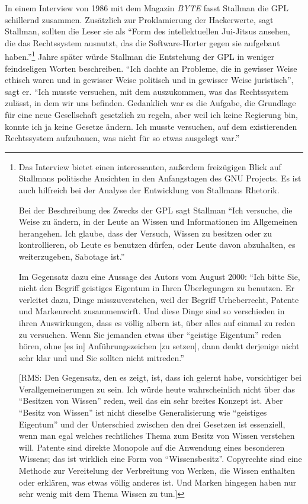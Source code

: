 In einem Interview von 1986 mit dem Magazin \textit{BYTE} fasst Stallman die GPL schillernd zusammen. Zusätzlich zur Proklamierung der Hackerwerte, sagt Stallman, sollten die Leser sie als "`Form des intellektuellen Jui-Jitsus ansehen, die das Rechtssystem ausnutzt, das die Software-Horter gegen sie aufgebaut haben."'\footnote{\cite[Vgl.][]{byte}

Das Interview bietet einen interessanten, außerdem freizügigen Blick auf Stallmans politische Ansichten in den Anfangstagen des GNU Projects. Es ist auch hilfreich bei der Analyse der Entwicklung von Stallmans Rhetorik.

Bei der Beschreibung des Zwecks der GPL sagt Stallman "`Ich versuche, die Weise zu ändern, in der Leute an Wissen und Informationen im Allgemeinen herangehen. Ich glaube, dass der Versuch, Wissen zu besitzen oder zu kontrollieren, ob Leute es benutzen dürfen, oder Leute davon abzuhalten, es weiterzugeben, Sabotage ist."'

Im Gegensatz dazu eine Aussage des Autors vom August 2000: "`Ich bitte Sie, nicht den Begriff \glq geistiges Eigentum\grq{} in Ihren Überlegungen zu benutzen. Er verleitet dazu, Dinge misszuverstehen, weil der Begriff Urheberrecht, Patente und Markenrecht zusammenwirft. Und diese Dinge sind so verschieden in ihren Auswirkungen, dass es völlig albern ist, über alles auf einmal zu reden zu versuchen. Wenn Sie jemanden etwas über "`geistige Eigentum"' reden hören, ohne [es in] Anführungszeichen [zu setzen], dann denkt derjenige nicht sehr klar und und Sie sollten nicht mitreden."'

[RMS: Den Gegensatz, den es zeigt, ist, dass ich gelernt habe, vorsichtiger bei Verallgemeinerungen zu sein. Ich würde heute wahrscheinlich nicht über das "`Besitzen von Wissen"' reden, weil das ein sehr breites Konzept ist. Aber "`Besitz von Wissen"' ist nicht dieselbe Generalisierung wie "`geistiges Eigentum"' und der Unterschied zwischen den drei Gesetzen ist essenziell, wenn man egal welches rechtliches Thema zum Besitz von Wissen verstehen will. Patente sind direkte Monopole auf die Anwendung eines besonderen Wissens; das ist wirklich eine Form von "`Wissensbesitz"'. Copyrechte sind eine Methode zur Vereitelung der Verbreitung von Werken, die Wissen enthalten oder erklären, was etwas völlig anderes ist. Und Marken hingegen haben nur sehr wenig mit dem Thema Wissen zu tun.]} Jahre später würde Stallman die Entstehung der GPL in weniger feindseligen Worten beschreiben. "`Ich dachte an Probleme, die in gewisser Weise ethisch waren und in gewisser Weise politisch und in gewisser Weise juristisch"', sagt er. "`Ich musste versuchen, mit dem auszukommen, was das Rechtssystem zulässt, in dem wir uns befinden. Gedanklich war es die Aufgabe, die Grundlage für eine neue Gesellschaft gesetzlich zu regeln, aber weil ich keine Regierung bin, konnte ich ja keine Gesetze ändern. Ich musste versuchen, auf dem existierenden Rechtssystem aufzubauen, was nicht für so etwas ausgelegt war."'

